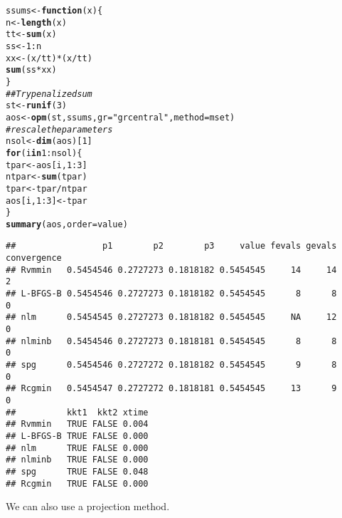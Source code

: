\documentclass[11pt]{article}\usepackage[]{graphicx}\usepackage[]{color}
\makeatletter
\newcommand{\hlnum}[1]{\textcolor[rgb]{0.686,0.059,0.569}{#1}}%
\newcommand{\hlstr}[1]{\textcolor[rgb]{0.192,0.494,0.8}{#1}}%
\newcommand{\hlcom}[1]{\textcolor[rgb]{0.678,0.584,0.686}{\textit{#1}}}%
\newcommand{\hlopt}[1]{\textcolor[rgb]{0,0,0}{#1}}%
\newcommand{\hlstd}[1]{\textcolor[rgb]{0.345,0.345,0.345}{#1}}%
\newcommand{\hlkwa}[1]{\textcolor[rgb]{0.161,0.373,0.58}{\textbf{#1}}}%
\newcommand{\hlkwb}[1]{\textcolor[rgb]{0.69,0.353,0.396}{#1}}%
\newcommand{\hlkwc}[1]{\textcolor[rgb]{0.333,0.667,0.333}{#1}}%
\newcommand{\hlkwd}[1]{\textcolor[rgb]{0.737,0.353,0.396}{\textbf{#1}}}%
\newenvironment{kframe}{%
 \def\at@end@of@kframe{}%
 \ifinner\ifhmode%
  \def\at@end@of@kframe{\end{minipage}}%
  \begin{minipage}{\columnwidth}%
 \fi\fi%
 \def\FrameCommand##1{\hskip\@totalleftmargin \hskip-\fboxsep
 \colorbox{shadecolor}{##1}\hskip-\fboxsep
     \hskip-\linewidth \hskip-\@totalleftmargin \hskip\columnwidth}%
 \MakeFramed {\advance\hsize-\width
   \@totalleftmargin\z@ \linewidth\hsize
   \@setminipage}}%
 {\par\unskip\endMakeFramed%
 \at@end@of@kframe}
\newenvironment{knitrout}{}{} %
\makeatother
\begin{document}
\begin{knitrout}\scriptsize
{}\color{fgcolor}\begin{kframe}
\begin{alltt}
\hlstd{ssums}\hlkwb{<-}\hlkwa{function}\hlstd{(}\hlkwc{x}\hlstd{)\{}
  \hlstd{n}\hlkwb{<-}\hlkwd{length}\hlstd{(x)}
  \hlstd{tt}\hlkwb{<-}\hlkwd{sum}\hlstd{(x)}
  \hlstd{ss}\hlkwb{<-}\hlnum{1}\hlopt{:}\hlstd{n}
  \hlstd{xx}\hlkwb{<-}\hlstd{(x}\hlopt{/}\hlstd{tt)}\hlopt{*}\hlstd{(x}\hlopt{/}\hlstd{tt)}
  \hlkwd{sum}\hlstd{(ss}\hlopt{*}\hlstd{xx)}
\hlstd{\}}
\hlcom{## Try penalized sum}
\hlstd{st}\hlkwb{<-}\hlkwd{runif}\hlstd{(}\hlnum{3}\hlstd{)}
\hlstd{aos}\hlkwb{<-}\hlkwd{opm}\hlstd{(st, ssums,} \hlkwc{gr}\hlstd{=}\hlstr{"grcentral"}\hlstd{,} \hlkwc{method}\hlstd{=mset)}
\hlcom{# rescale the parameters}
\hlstd{nsol}\hlkwb{<-}\hlkwd{dim}\hlstd{(aos)[}\hlnum{1}\hlstd{]}
\hlkwa{for} \hlstd{(i} \hlkwa{in} \hlnum{1}\hlopt{:}\hlstd{nsol)\{}
  \hlstd{tpar}\hlkwb{<-}\hlstd{aos[i,}\hlnum{1}\hlopt{:}\hlnum{3}\hlstd{]}
  \hlstd{ntpar}\hlkwb{<-}\hlkwd{sum}\hlstd{(tpar)}
  \hlstd{tpar}\hlkwb{<-}\hlstd{tpar}\hlopt{/}\hlstd{ntpar}
  \hlstd{aos[i,} \hlnum{1}\hlopt{:}\hlnum{3}\hlstd{]}\hlkwb{<-}\hlstd{tpar}
\hlstd{\}}
\hlkwd{summary}\hlstd{(aos,}\hlkwc{order}\hlstd{=value)}
\end{alltt}
\begin{verbatim}
##                 p1        p2        p3     value fevals gevals convergence
## Rvmmin   0.5454546 0.2727273 0.1818182 0.5454545     14     14           2
## L-BFGS-B 0.5454546 0.2727273 0.1818182 0.5454545      8      8           0
## nlm      0.5454545 0.2727273 0.1818182 0.5454545     NA     12           0
## nlminb   0.5454546 0.2727273 0.1818181 0.5454545      8      8           0
## spg      0.5454546 0.2727272 0.1818182 0.5454545      9      8           0
## Rcgmin   0.5454547 0.2727272 0.1818181 0.5454545     13      9           0
##          kkt1  kkt2 xtime
## Rvmmin   TRUE FALSE 0.004
## L-BFGS-B TRUE FALSE 0.000
## nlm      TRUE FALSE 0.000
## nlminb   TRUE FALSE 0.000
## spg      TRUE FALSE 0.048
## Rcgmin   TRUE FALSE 0.000
\end{verbatim}
\end{kframe}
\end{knitrout}

We can also use a projection method.
\end{document}
